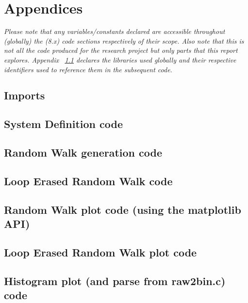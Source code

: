 \documentclass{article}
\begin{document}
\appendix
\section{Appendices}
	\emph{Please note that any variables/constants declared are accessible throughout (globally) the (8.x) code sections respectively of their scope. Also note that this is not all the code produced for the research project but only parts that this report explores. Appendix ~\ref{sssec:imports} declares the libraries used globally and their respective identifiers used to reference them in the subsequent code.}
	\subsection{Imports} \label{sssec:imports}
	
	\subsection{System Definition code} \label{sssec:sysdef}
	
	\subsection{Random Walk generation code} \label{sssec:srwgen}
	
	\subsection{Loop Erased Random Walk code} \label{sssec:lerw}
	
	\subsection{Random Walk plot code (using the matplotlib API)} \label{sssec:rwplot}
	
	\subsection{Loop Erased Random Walk plot code} \label{sssec:lerwplot}
	
	\subsection{Histogram plot (and parse from raw2bin.c) code} \label{sssec:histparse}
	
\hphantom
\newline
\end{document}
